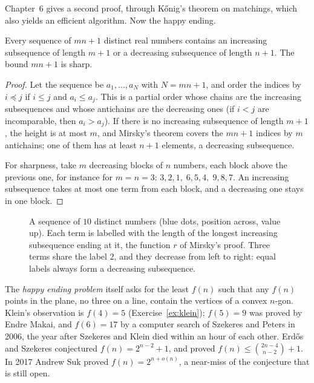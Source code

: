 Chapter~6 gives a second proof, through K\H onig's theorem on matchings, which also yields an efficient algorithm. Now
the happy ending.

\begin{theorem}\label{thm:es}
Every sequence of $mn+1$ distinct real numbers contains an increasing subsequence of length $m+1$ or a decreasing
subsequence of length $n+1$. The bound $mn+1$ is sharp.
\end{theorem}
\begin{proof}
Let the sequence be $a_1,\dots,a_N$ with $N=mn+1$, and order the indices by $i\preceq j$ if $i\le j$ and $a_i\le a_j$. This is a partial order whose
chains are the increasing subsequences and whose antichains are the decreasing ones (if $i<j$ are incomparable, then
$a_i>a_j$). If there is no increasing subsequence of length $m+1$, the height is at most $m$, and Mirsky's theorem covers the $mn+1$
indices by $m$ antichains; one of them has at least $n+1$ elements, a decreasing subsequence.

For sharpness, take $m$ decreasing blocks of $n$ numbers, each block above the previous one, for instance for $m=n=3$:
$3,2,1,\;6,5,4,\;9,8,7$. An increasing subsequence takes at most one term from each block, and a decreasing one stays in one
block.
\end{proof}

\begin{figure}[ht]
\centering
{}
\caption{A sequence of $10$ distinct numbers (blue dots, position across, value up). Each term is labelled with the
length of the longest increasing subsequence ending at it, the function $r$ of Mirsky's proof. Three terms share
the label $2$, and they decrease from left to right: equal labels always form a decreasing subsequence.}
\label{fig:es}
\end{figure}

\begin{remark}
The \emph{happy ending problem} itself asks for the least $f(n)$ such that any $f(n)$ points in the plane, no three on a line,
contain the vertices of a convex $n$-gon. Klein's observation is $f(4)=5$ (Exercise~\ref{ex:klein}); $f(5)=9$ was proved by Endre Makai, and $f(6)=17$ by a computer search of Szekeres and Peters in 2006, the year after Szekeres and Klein died within an
hour of each other. Erd\H os and Szekeres conjectured $f(n)=2^{n-2}+1$, and proved $f(n)\le\binom{2n-4}{n-2}+1$. In 2017 Andrew Suk proved
$f(n)=2^{n+o(n)}$, a near-miss of the conjecture that is still open.
\end{remark}

